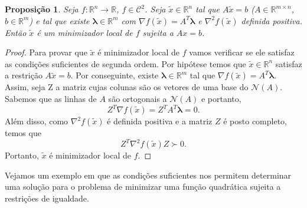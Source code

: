 \documentclass[12pt,a4paper]{scrartcl}
\def\RR{\mathds{R}}
\newtheorem{prop}{Proposição}
\theoremstyle{definition}%
\begin{document}
\begin{prop}
Seja $f: \RR^{n} \rightarrow \RR$, $f \in \mathcal{C}^{2}$. Seja $\tilde{x} \in \RR^{n}$ tal que $A\tilde{x} = b$ ($A\in \RR^{m\times n}$, $b\in \RR^{m}$) e tal que existe $\boldsymbol{\lambda} \in \RR^{m}$ com $\nabla f(\tilde{x}) = A^{T}\boldsymbol{\lambda}$ e $\nabla^{2} f(\tilde{x})$ definida positiva. Então $\tilde{x}$ é um minimizador local de $f$ sujeita a $Ax=b$.
\end{prop}
\begin{proof}
Para provar que $\tilde{x}$ é minimizador local de $f$ vamos verificar se ele satisfaz as condições suficientes de segunda ordem. Por hipótese temos que $\tilde{x} \in \RR^{n}$ satisfaz a restrição $A\tilde{x} = b$. Por conseguinte, existe $\boldsymbol{\lambda} \in \RR^{m}$ tal que $\nabla f(\tilde{x}) = A^{T}\boldsymbol{\lambda}$. Assim, seja Z a matriz cujas colunas são os vetores de uma base do $\mathcal{N}(A)$. Sabemos que as linhas de $A$ são ortogonais a $\mathcal{N}(A)$ e portanto,
\[
Z^{T}\nabla f(\tilde{x}) = Z^{T}A^{T}\boldsymbol{\lambda} = 0.
\]
Além disso, como $\nabla^{2} f(\tilde{x})$ é definida positiva e a matriz $Z$ é posto completo, temos que 
\[
Z^{T}\nabla^{2} f(\tilde{x}) Z \succ 0.
\]
Portanto, $\tilde{x}$ é minimizador local de $f$.
\end{proof}

Vejamos um exemplo em que as condições suficientes nos permitem determinar uma solução para o problema de minimizar uma função quadrática sujeita a restrições de igualdade.
\end{document}
